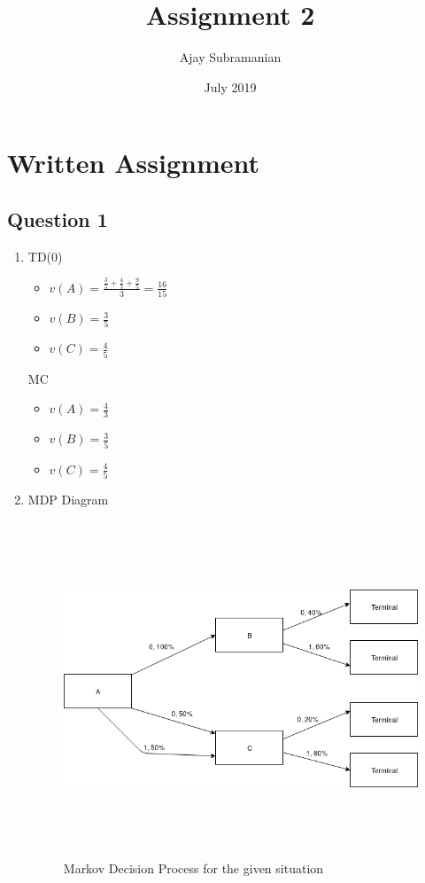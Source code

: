 \documentclass[12pt]{extarticle}
\title{Assignment 2}
\author{Ajay Subramanian}
\date{July 2019}
\begin{document}
\maketitle
\setcounter{secnumdepth}{0}

\section{Written Assignment}
\subsection{Question 1}
\begin{enumerate}[label=(\alph*)]
\item TD(0)
	\begin{itemize}
	\item $v(A) = \frac{\frac{3}{5} + \frac{4}{5} + \frac{9}{5}}{3} = \frac{16}{15}$
	\item $v(B) = \frac{3}{5}$
	\item $v(C) = \frac{4}{5}$
	\end{itemize}
	  MC
	\begin{itemize}
	\item $v(A) = \frac{4}{3}$
	\item $v(B) = \frac{3}{5}$
	\item $v(C) = \frac{4}{5}$
	\end{itemize}

\item MDP Diagram
	\begin{figure}[H]
		\includegraphics[width=\textwidth, height=10cm]{mdp.png}
		\caption{Markov Decision Process for the given situation}
		\label{fig:mdp}
	\end{figure}
	

\end{enumerate}
\end{document}
